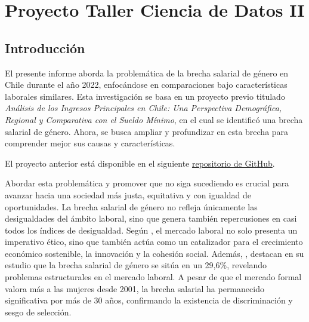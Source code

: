 \rhead{\newtitle}
\cfoot{\thepage}
\renewcommand{\headrulewidth}{1pt}
\renewcommand{\footrulewidth}{1pt}
\chapter{Proyecto Taller Ciencia de Datos II}

\section{Introducción}

El presente informe aborda la problemática de la brecha salarial de género en Chile durante el año 2022, enfocándose en comparaciones bajo características laborales similares. Esta investigación se basa en un proyecto previo titulado \textit{Análisis de los Ingresos Principales en Chile: Una Perspectiva Demográfica, Regional y Comparativa con el Sueldo Mínimo}, en el cual se identificó una brecha salarial de género. Ahora, se busca ampliar y profundizar en esta brecha para comprender mejor sus causas y características. 
\begin{center}
    {\footnotesize El proyecto anterior está disponible en el siguiente \href{https://github.com/ElK1000o/Taller-Ciencia-de-Datos-I/tree/main/Proyecto}{repositorio de GitHub}.}
\end{center}
Abordar esta problemática y promover que no siga sucediendo es crucial para avanzar hacia una sociedad más justa, equitativa y con igualdad de oportunidades. La brecha salarial de género no refleja únicamente las desigualdades del ámbito laboral, sino que genera también repercusiones en casi todos los índices de desigualdad. Según \citet{Castro-Romero2024}, el mercado laboral no solo presenta un imperativo ético, sino que también actúa como un catalizador para el crecimiento económico sostenible, la innovación y la cohesión social. Además, \citet{Cuellar2022}, destacan en su estudio que la brecha salarial de género se sitúa en un 29,6\%, revelando problemas estructurales en el mercado laboral. A pesar de que el mercado formal valora más a las mujeres desde 2001, la brecha salarial ha permanecido significativa por más de 30 años, confirmando la existencia de discriminación y sesgo de selección.

